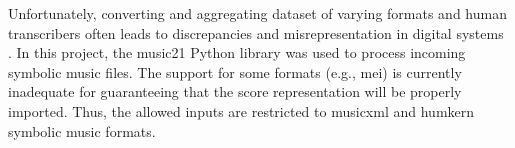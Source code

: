 

Unfortunately, converting and aggregating dataset of varying
formats and human transcribers often leads to discrepancies
and misrepresentation in digital systems
\parencite{napoleslopez2018encoding,
napoleslopez2019effects}. In this project, the music21
Python library \parencite{cuthbert2010music21} was used to
process incoming symbolic music files. The support for some
formats (e.g., \gls{mei}) is currently inadequate for
guaranteeing that the score representation will be properly
imported. Thus, the allowed inputs are restricted to
\gls{musicxml} and \gls{humkern} symbolic music formats.
